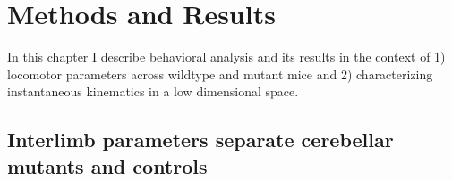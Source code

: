 \section{Methods and Results}

In this chapter I describe behavioral analysis and its results in the context of 1) locomotor parameters across wildtype and mutant mice and 2) characterizing instantaneous kinematics in a low dimensional space.

\subsection{Interlimb parameters separate cerebellar mutants and controls}

